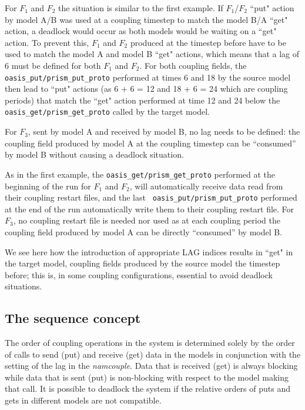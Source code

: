 \begin{enumerate}
  For $F_1$ and $F_2$ the situation is similar to the first
  example. If $F_1$/$F_2$ ``put" action by model A/B was used at a
  coupling timestep to match the model B/A ``get" action, a
  deadlock would occur as both models would be waiting on a ``get"
  action. To prevent this, $F_1$ and $F_2$ produced at the timestep
  before have to be used to match the model A and model B ``get"
  actions, which means that a lag of 6 must be defined for both $F_1$
  and $F_2$. For both coupling fields, the {\tt oasis\_put/prism\_put\_proto}
  performed at times 6 and 18 by the source model then lead to ``put"
  actions (as 6 + 6 = 12 and 18 + 6 = 24 which are coupling periods)
  that match the ``get" action performed at time 12 and 24 below
  the {\tt oasis\_get/prism\_get\_proto} called by the target model.

  For $F_3$, sent by model A and received by model B, no lag
  needs to be defined: the coupling field produced by model A at the
  coupling timestep can be ``consumed'' by model B without causing a
  deadlock situation.

  As in the first example, the {\tt oasis\_get/prism\_get\_proto} performed at
  the beginning of the run for $F_1$ and $F_2$, will automatically receive data read from their coupling restart files, and the last {\tt
  oasis\_put/prism\_put\_proto} performed at the end of the run automatically
  write them to their coupling restart file. For $F_3$, no coupling
  restart file is needed nor used as at each coupling period the
  coupling field produced by model A can be directly ``consumed'' by
  model B.

  We see here how the introduction of appropriate LAG indices results in
  ``get" in the target model,
  coupling fields produced by the
  source model the timestep before; this is, in some coupling
  configurations, essential to avoid deadlock situations.

  \end{enumerate}

\subsection{The sequence concept}

The order of coupling operations in the system is determined solely
by the order of calls to send (put) and receive (get) data in the models
in conjunction with the setting of the lag in the {\it namcouple}.  Data that is
received (get) is always blocking while data that is sent (put) is non-blocking
with respect to the model making that call.  It is possible
to deadlock the system if the relative orders of puts and gets in different
models are not compatible. 

